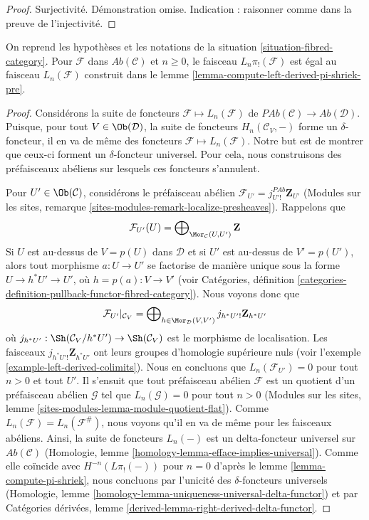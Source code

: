 \begin{proof}
\medskip\noindent
Surjectivité. Démonstration omise. Indication : raisonner comme dans la preuve de
l'injectivité.
\end{proof}

\begin{lemma}
\label{lemma-compute-left-derived-pi-shriek}
On reprend les hypothèses et les notations de la situation \ref{situation-fibred-category}.
Pour $\mathcal{F}$ dans $\textit{Ab}(\mathcal{C})$ et $n \geq 0$,
le faisceau $L_n\pi_!(\mathcal{F})$ est égal au faisceau
$L_n(\mathcal{F})$ construit dans le
lemme \ref{lemma-compute-left-derived-pi-shriek-pre}.
\end{lemma}

\begin{proof}
Considérons la suite de foncteurs $\mathcal{F} \mapsto L_n(\mathcal{F})$
de $\textit{PAb}(\mathcal{C}) \to \textit{Ab}(\mathcal{D})$.
Puisque, pour tout $V \in \Ob(\mathcal{D})$, la suite de foncteurs
$H_n(\mathcal{C}_V, - )$ forme un $\delta$-foncteur,
il en va de même des foncteurs $\mathcal{F} \mapsto L_n(\mathcal{F})$.
Notre but est de montrer que ceux-ci forment un $\delta$-foncteur universel.
Pour cela, nous construisons des préfaisceaux abéliens
sur lesquels ces foncteurs s'annulent.

\medskip\noindent
Pour $U' \in \Ob(\mathcal{C})$, considérons le préfaisceau abélien
$\mathcal{F}_{U'} = j_{U'!}^{\textit{PAb}}\mathbf{Z}_{U'}$
(Modules sur les sites, remarque \ref{sites-modules-remark-localize-presheaves}).
Rappelons que
$$
\mathcal{F}_{U'}(U) =
\bigoplus\nolimits_{\Mor_\mathcal{C}(U, U')} \mathbf{Z}
$$
Si $U$ est au-dessus de $V = p(U)$ dans $\mathcal{D}$ et si $U'$ est au-dessus de $V' = p(U')$,
alors tout morphisme $a : U \to U'$ se factorise de manière unique sous la forme $U \to h^*U' \to U'$,
où $h = p(a) : V \to V'$ (voir
Catégories, définition
\ref{categories-definition-pullback-functor-fibred-category}).
Nous voyons donc que
$$
\mathcal{F}_{U'}|_{\mathcal{C}_V}
=
\bigoplus\nolimits_{h \in \Mor_\mathcal{D}(V, V')}
j_{h^*U'!}\mathbf{Z}_{h^*U'}
$$
où $j_{h^*U'} : \Sh(\mathcal{C}_V/h^*U') \to \Sh(\mathcal{C}_V)$
est le morphisme de localisation. Les faisceaux $j_{h^*U'!}\mathbf{Z}_{h^*U'}$
ont leurs groupes d'homologie supérieure nuls (voir
l'exemple \ref{example-left-derived-colimits}).
Nous en concluons que $L_n(\mathcal{F}_{U'}) = 0$ pour tout $n > 0$ et tout $U'$.
Il s'ensuit que tout préfaisceau abélien $\mathcal{F}$ est un quotient
d'un préfaisceau abélien $\mathcal{G}$ tel que $L_n(\mathcal{G}) = 0$ pour
tout $n > 0$ (Modules sur les sites, lemme
\ref{sites-modules-lemma-module-quotient-flat}).
Comme $L_n(\mathcal{F}) = L_n(\mathcal{F}^\#)$, nous voyons
qu'il en va de même pour les faisceaux abéliens. Ainsi,
la suite de foncteurs $L_n(-)$ est un delta-foncteur universel
sur $\textit{Ab}(\mathcal{C})$
(Homologie, lemme \ref{homology-lemma-efface-implies-universal}).
Comme elle coïncide avec
$H^{-n}(L\pi_!(-))$ pour $n = 0$ d'après le
lemme \ref{lemma-compute-pi-shriek},
nous concluons par l'unicité des $\delta$-foncteurs universels
(Homologie, lemme \ref{homology-lemma-uniqueness-universal-delta-functor})
et par
Catégories dérivées, lemme \ref{derived-lemma-right-derived-delta-functor}.
\end{proof}

